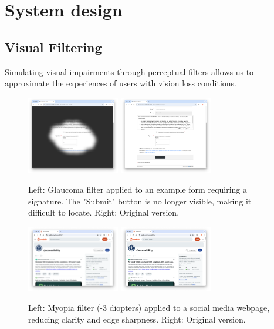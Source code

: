 
\section{System design}
\subsection{Visual Filtering}

Simulating visual impairments through perceptual filters allows us to approximate the experiences of users with vision loss conditions.

\begin{figure}
    \centering
    \includegraphics[width=115pt]{imgs/glaucoma-filter.png}
    \includegraphics[width=115pt]{imgs/no-glaucoma-filter.png}
    \caption{Left: Glaucoma filter applied to an example form requiring a signature. The "Submit" button is no longer visible, making it difficult to locate. Right: Original version.}
    \vspace{-13pt}
    \label{fig:glaucoma-filters}
\end{figure}

\begin{figure}
    \centering
    \includegraphics[width=115pt]{imgs/myopia-filter.png}
    \includegraphics[width=115pt]{imgs/no-myopia-filter.png}
    \caption{Left: Myopia filter (-3 diopters) applied to a social media webpage, reducing clarity and edge sharpness. Right: Original version.}
    \vspace{-13pt}
    \label{fig:myopia-filters}
\end{figure}

